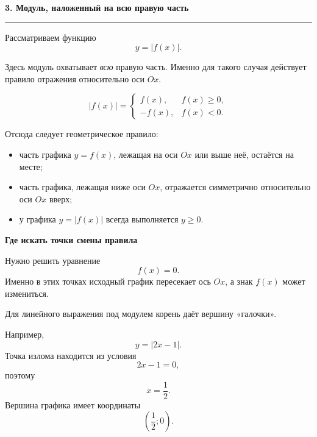 \documentclass[a4paper,12pt]{article}
\newcommand{\topic}[1]{%
  \vspace{0.25em}
  {\Large\bfseries\color{darkaccent}#1}\par
  \vspace{0.1em}
  {\color{accent}\rule{\linewidth}{0.7pt}}\par
  \vspace{0.35em}
}
\newcommand{\subtopic}[1]{%
  \vspace{0.35em}
  {\large\bfseries\color{darkaccent}#1}\par
  \vspace{0.1em}
}
\begin{document}

\clearpage
\topic{3. Модуль, наложенный на всю правую часть}

Рассматриваем функцию
\[
  y=|f(x)|.
\]

Здесь модуль охватывает \emph{всю} правую часть. Именно для такого случая действует правило отражения относительно оси $Ox$.

\[
  |f(x)|=
  \begin{cases}
    f(x), & f(x)\ge0,\\
    -f(x), & f(x)<0.
  \end{cases}
\]

Отсюда следует геометрическое правило:

\begin{itemize}
  \item часть графика $y=f(x)$, лежащая на оси $Ox$ или выше неё, остаётся на месте;
  \item часть графика, лежащая ниже оси $Ox$, отражается симметрично относительно оси $Ox$ вверх;
  \item у графика $y=|f(x)|$ всегда выполняется $y\ge0$.
\end{itemize}

\subtopic{Где искать точки смены правила}

Нужно решить уравнение
\[
  f(x)=0.
\]
Именно в этих точках исходный график пересекает ось $Ox$,
а знак $f(x)$ может измениться.

Для линейного выражения под модулем корень даёт вершину «галочки».

Например,
\[
  y=|2x-1|.
\]
Точка излома находится из условия
\[
  2x-1=0,
\]
поэтому
\[
  x=\frac12.
\]
Вершина графика имеет координаты
\[
  \left(\frac12;0\right).
\]

\begin{figure}[ht]
\centering
{}
\end{figure}
\end{document}
